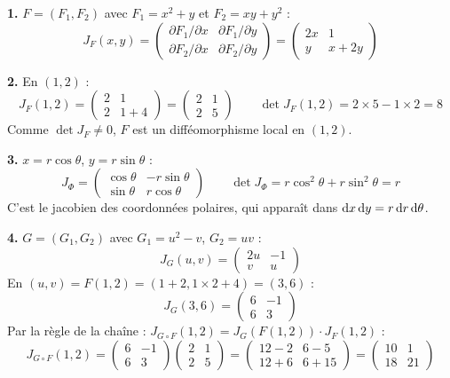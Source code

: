 \documentclass[12pt,a4paper]{article}
\begin{document}
\begin{boitecorrige}
\textbf{1.} $F = (F_1, F_2)$ avec $F_1 = x^2+y$ et $F_2 = xy+y^2$ :
\[
J_F(x,y) = \begin{pmatrix}\partial F_1/\partial x & \partial F_1/\partial y\\\partial F_2/\partial x & \partial F_2/\partial y\end{pmatrix} = \begin{pmatrix}2x & 1\\y & x+2y\end{pmatrix}
\]

\textbf{2.} En $(1,2)$ :
\[
J_F(1,2) = \begin{pmatrix}2 & 1\\2 & 1+4\end{pmatrix} = \begin{pmatrix}2 & 1\\2 & 5\end{pmatrix} \qquad \det J_F(1,2) = 2\times5 - 1\times2 = 8
\]
Comme $\det J_F \neq 0$, $F$ est un difféomorphisme local en $(1,2)$.

\textbf{3.} $x = r\cos\theta$, $y = r\sin\theta$ :
\[
J_\Phi = \begin{pmatrix}\cos\theta & -r\sin\theta\\\sin\theta & r\cos\theta\end{pmatrix} \qquad \det J_\Phi = r\cos^2\theta + r\sin^2\theta = r
\]
C'est le jacobien des coordonnées polaires, qui apparaît dans $\mathrm{d} x\,\mathrm{d} y = r\,\mathrm{d} r\,\mathrm{d}\theta$.

\textbf{4.} $G = (G_1,G_2)$ avec $G_1 = u^2-v$, $G_2 = uv$ :
\[
J_G(u,v) = \begin{pmatrix}2u & -1\\v & u\end{pmatrix}
\]
En $(u,v) = F(1,2) = (1+2, 1\times2+4) = (3, 6)$ :
\[
J_G(3,6) = \begin{pmatrix}6 & -1\\6 & 3\end{pmatrix}
\]
Par la règle de la chaîne : $J_{G\circ F}(1,2) = J_G(F(1,2))\cdot J_F(1,2)$ :
\[
J_{G\circ F}(1,2) = \begin{pmatrix}6 & -1\\6 & 3\end{pmatrix}\begin{pmatrix}2 & 1\\2 & 5\end{pmatrix} = \begin{pmatrix}12-2 & 6-5\\12+6 & 6+15\end{pmatrix} = \begin{pmatrix}10 & 1\\18 & 21\end{pmatrix}
\]
\end{boitecorrige}
\end{document}
